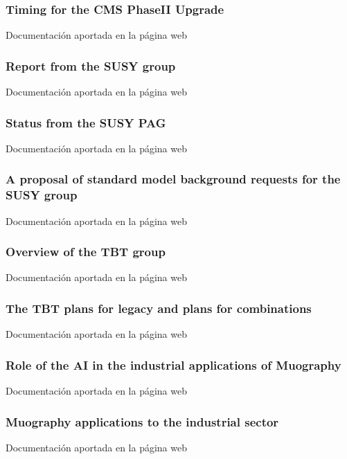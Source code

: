 \documentclass[a4paper, 11pt, twoside, openright]{report}
\begin{document}
\subsubsection{Timing for the CMS PhaseII Upgrade}
%
Documentación aportada en la página web

\subsubsection{Report from the SUSY group}
%
Documentación aportada en la página web

\subsubsection{Status from the SUSY PAG}
%
Documentación aportada en la página web

\subsubsection{A proposal of standard model background requests for the SUSY group}
%
Documentación aportada en la página web

\subsubsection{Overview of the TBT group}
%
Documentación aportada en la página web

\subsubsection{The TBT plans for legacy and plans for combinations}
%
Documentación aportada en la página web

\subsubsection{Role of the AI in the industrial applications of Muography}
%
Documentación aportada en la página web

\subsubsection{Muography applications to the industrial sector}
%
Documentación aportada en la página web
\end{document}
